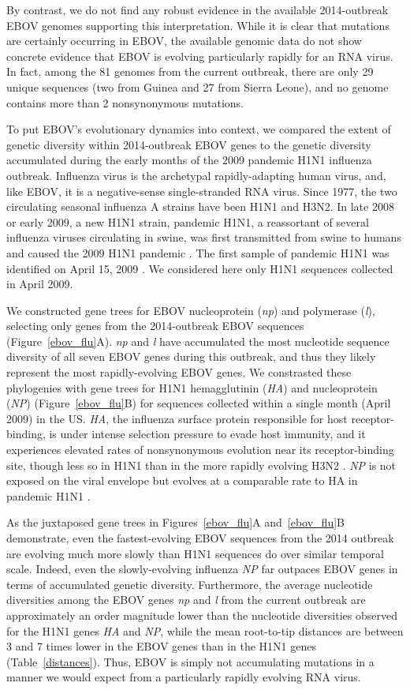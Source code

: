 \documentclass[11pt]{article}
\begin{document}
By contrast, we do not find any robust evidence in the available 2014-outbreak EBOV genomes supporting this interpretation. While it is clear that mutations are certainly occurring in EBOV, the available genomic data do not show concrete evidence that EBOV is evolving particularly rapidly for an RNA virus. In fact, among the 81 genomes from the current outbreak, there are only 29 unique sequences (two from Guinea and 27 from Sierra Leone), and no genome contains more than 2 nonsynonymous mutations.

To put EBOV's evolutionary dynamics into context, we compared the extent of genetic diversity within 2014-outbreak EBOV genes to the genetic diversity accumulated during the early months of the 2009 pandemic H1N1 influenza outbreak. Influenza virus is the archetypal rapidly-adapting human virus, and, like EBOV, it is a negative-sense single-stranded RNA virus. Since 1977, the two circulating seasonal influenza A strains have been H1N1 and H3N2. In late 2008 or early 2009, a new H1N1 strain, pandemic H1N1, a reassortant of several influenza viruses circulating in swine, was first transmitted from swine to humans and caused the 2009 H1N1 pandemic \cite{Smithetal2009}. The first sample of pandemic H1N1 was identified on April 15, 2009 \citep{Neumannetal2009}. We considered here only H1N1 sequences collected in April 2009. 

We constructed gene trees for EBOV nucleoprotein (\emph{np}) and polymerase (\emph{l}), selecting only genes from the 2014-outbreak EBOV sequences (Figure~\ref{ebov_flu}A). \emph{np} and \emph{l} have accumulated the most nucleotide sequence diversity of all seven EBOV genes during this outbreak, and thus they likely represent the most rapidly-evolving EBOV genes. We constrasted these phylogenies with gene trees for H1N1 hemagglutinin (\emph{HA}) and nucleoprotein (\emph{NP}) (Figure~\ref{ebov_flu}B) for sequences collected within a single month (April 2009) in the US. \emph{HA}, the influenza surface protein responsible for host receptor-binding, is under intense selection pressure to evade host immunity, and it experiences elevated rates of nonsynonymous evolution near its receptor-binding site, though less so in H1N1 than in the more rapidly evolving H3N2 \citep{Meyer2012}. \emph{NP} is not exposed on the viral envelope but evolves at a comparable rate to HA in pandemic H1N1 \citep{Quetal2011}.

As the juxtaposed gene trees in Figures~\ref{ebov_flu}A and~\ref{ebov_flu}B  demonstrate, even the fastest-evolving EBOV sequences from the 2014 outbreak are evolving much more slowly than H1N1 sequences do over similar temporal scale. Indeed, even the slowly-evolving influenza \emph{NP} far outpaces EBOV genes in terms of accumulated genetic diversity. Furthermore, the average nucleotide diversities among the EBOV genes \emph{np} and \emph{l} from the current outbreak are approximately an order magnitude lower than the nucleotide diversities observed for the H1N1 genes \emph{HA} and \emph{NP}, while the mean root-to-tip distances are between 3 and 7 times lower in the EBOV genes than in the H1N1 genes (Table~\ref{distances}). Thus, EBOV is simply not accumulating mutations in a manner we would expect from a particularly rapidly evolving RNA virus.
\end{document}
